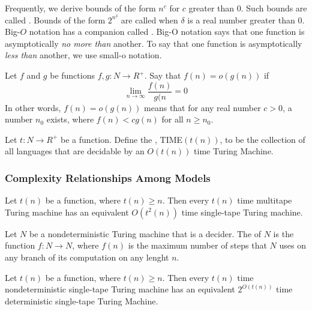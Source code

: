 \documentclass{article}
\begin{document}
Frequently, we derive bounds of the form $n^c$ for $c$ greater than 0. Such bounds are called . Bounds of the form $2^{n^{\delta}}$ are called  when $\delta$ is a real number greater than 0. \\ 

Big-$O$ notation has a companion called . Big-O notation says that one function is asymptotically \emph{no more than} another. To say that one function is asymptotically \emph{less than} another, we use small-o notation. 

\begin{definition}
  Let $f$ and $g$ be functions $f,g: N \rightarrow R^{+}$. Say that $f(n) = o(g(n))$ if $$\lim_{n\to\infty} \frac{f(n)}{g(n} = 0$$ In other words, $f(n) = o(g(n))$ means that for any real number $c>0$, a number $n_0$ exists, where $f(n) < c g(n)$ for all $n \geq n_0$. 
\end{definition}

\begin{definition}
  Let $t: N \rightarrow R^{+}$ be a function. Define the , TIME$(t(n))$, to be the collection of all languages that are decidable by an $O(t(n))$ time Turing Machine. 
\end{definition}

\subsubsection{Complexity Relationships Among Models}

\begin{theorem}
  Let $t(n)$ be a function, where $t(n) \geq n$. Then every $t(n)$ time multitape Turing machine has an equivalent $O(t^{2}(n))$ time single-tape Turing machine. 
\end{theorem}

\begin{definition}
  Let $N$ be a nondeterministic Turing machine that is a decider. The  of $N$ is the function $f: N \rightarrow N$, where $f(n)$ is the maximum number of steps that $N$ uses on any branch of its computation on any lenght $n$. 
\end{definition}

\begin{theorem}
  Let $t(n)$ be a function, where $t(n) \geq n$. Then every $t(n)$ time nondeterministic single-tape Turing machine has an equivalent $2^{O(t(n))}$ time deterministic single-tape Turing Machine. 
\end{theorem}
\end{document}
